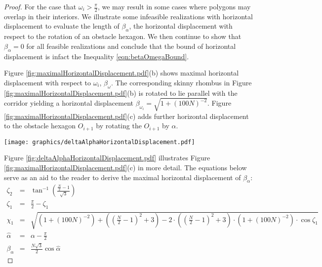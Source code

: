 \documentclass[10pt]{CSUNthesis}
\theoremstyle{plain}%
\theoremstyle{definition}
\theoremstyle{remark}
\newcommand{\lr}[1]{\left( #1 \right)}
\begin{document}
\begin{proof}
For the case that $\omega_i > \frac{\pi}{2}$, we may result in some cases where polygons may overlap in their interiors. 
We illustrate some infeasible realizations with horizontal displacement to evaluate the length of $\beta_\alpha$, the horizontal displacement with respect to the rotation of an obstacle hexagon.  
We then continue to show that $\beta_\alpha = 0$ for all feasible realizations and conclude that the bound of horizontal displacement is infact the Inequality \ref{eqn:betaOmegaBound}. 

Figure \ref{fig:maximalHorizontalDisplacement.pdf}(b) shows maximal horizontal displacement with respect to $\omega_i$, $\beta_\omega$.  
The corresponding skinny rhombus in Figure \ref{fig:maximalHorizontalDisplacement.pdf}(b) is rotated to lie parallel with the corridor yielding a horizontal displacement $\beta_{\omega_i} = \sqrt{1 + \lr{100N}^{-2} }$.  
Figure \ref{fig:maximalHorizontalDisplacement.pdf}(c) adds further horizontal displacement to the obstacle hexagon $O_{i+1}$ by rotating the $O_{i+1}$ by $\alpha$.  

\begin{minipage}{\linewidth}
\begin{center}
\texttt{[image: graphics/deltaAlphaHorizontalDisplacement.pdf]}
\label{fig:deltaAlphaHorizontalDisplacement.pdf}
\end{center}
\end{minipage}

Figure \ref{fig:deltaAlphaHorizontalDisplacement.pdf} illustrates Figure \ref{fig:maximalHorizontalDisplacement.pdf}(c) in more detail.  
The equations below serve as an aid to the reader to derive the maximal horizontal displacement of $\beta_\alpha$:
$$
\begin{array}{rcl}
\zeta_2 &=& \tan^{-1} \lr{\frac{\frac{N}{2}-1}{\sqrt{3}}}\\
\zeta_1 &=& \frac{\pi}{2} - \zeta_1\\
\chi_1 &=& \sqrt{\lr{1+(100N)^{-2}} + \lr{\lr{\frac{N}{2}-1}^2 + 3} - 2 \cdot \lr{\lr{\frac{N}{2}-1}^2 + 3}\cdot \lr{1+(100N)^{-2}}  \cdot \cos \zeta_1       }\\
\hat{\alpha} &=& \alpha - \frac{\pi}{2}\\
\beta_\alpha &=& \frac{N\sqrt{3}}{2} \cos \hat{\alpha}
\end{array}
$$


\end{proof}
\end{document}
